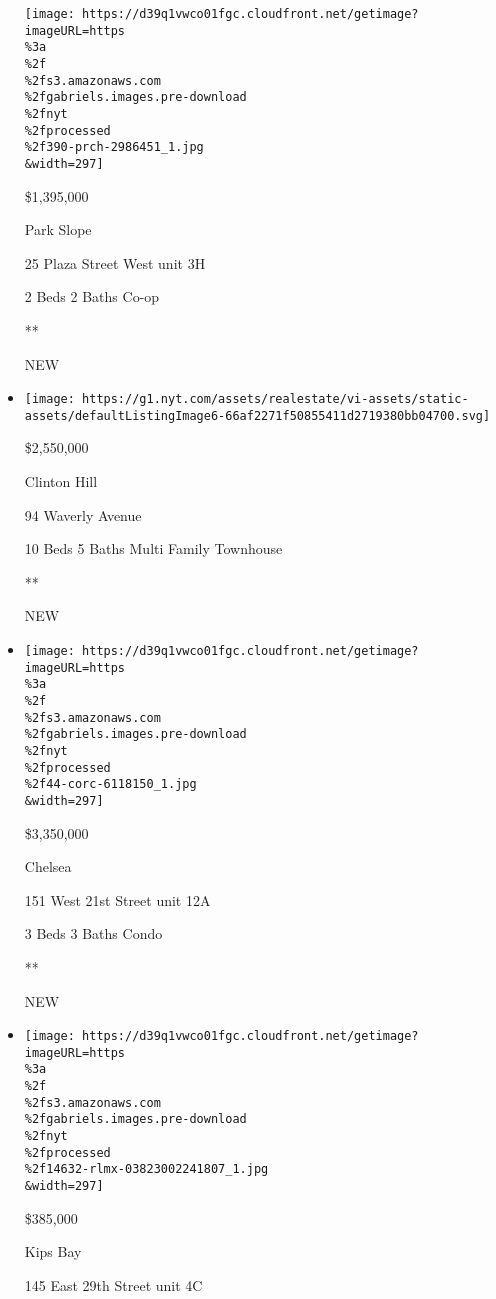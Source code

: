 \begin{itemize}
  \texttt{[image: https://d39q1vwco01fgc.cloudfront.net/getimage?imageURL=https\\\%3a\\\%2f\\\%2fs3.amazonaws.com\\\%2fgabriels.images.pre-download\\\%2fnyt\\\%2fprocessed\\\%2f390-prch-2986451\_1.jpg\\\&width=297]}

  \$1,395,000

  Park Slope

  25 Plaza Street West unit 3H

  2 Beds \textbar{} 2 Baths \textbar{} Co-op

  **

  NEW
\item
  \href{/real-estate/usa/ny/brooklyn/clinton-hill/homes-for-sale/94-waverly-avenue/12436-OLRS-0079241?}{}

  \texttt{[image: https://g1.nyt.com/assets/realestate/vi-assets/static-assets/defaultListingImage6-66af2271f50855411d2719380bb04700.svg]}

  \$2,550,000

  Clinton Hill

  94 Waverly Avenue

  10 Beds \textbar{} 5 Baths \textbar{} Multi Family Townhouse

  **

  NEW
\item
  \href{/real-estate/usa/ny/new-york/chelsea/homes-for-sale/151-west-21st-street/44-CORC-6118150?}{}

  \texttt{[image: https://d39q1vwco01fgc.cloudfront.net/getimage?imageURL=https\\\%3a\\\%2f\\\%2fs3.amazonaws.com\\\%2fgabriels.images.pre-download\\\%2fnyt\\\%2fprocessed\\\%2f44-corc-6118150\_1.jpg\\\&width=297]}

  \$3,350,000

  Chelsea

  151 West 21st Street unit 12A

  3 Beds \textbar{} 3 Baths \textbar{} Condo

  **

  NEW
\item
  \href{/real-estate/usa/ny/new-york/kips-bay/homes-for-sale/145-east-29th-street/14632-RLMX-03823002241807?}{}

  \texttt{[image: https://d39q1vwco01fgc.cloudfront.net/getimage?imageURL=https\\\%3a\\\%2f\\\%2fs3.amazonaws.com\\\%2fgabriels.images.pre-download\\\%2fnyt\\\%2fprocessed\\\%2f14632-rlmx-03823002241807\_1.jpg\\\&width=297]}

  \$385,000

  Kips Bay

  145 East 29th Street unit 4C


\end{itemize}
